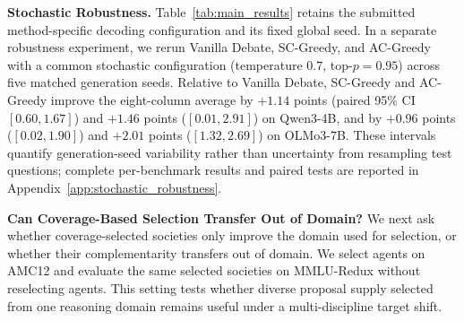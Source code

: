 \textbf{Stochastic Robustness.}
Table~\ref{tab:main_results} retains the submitted method-specific decoding
configuration and its fixed global seed. In a separate robustness experiment,
we rerun Vanilla Debate, SC-Greedy, and AC-Greedy with a common stochastic
configuration (temperature $0.7$, top-$p=0.95$) across five matched generation
seeds. Relative to Vanilla Debate, SC-Greedy and AC-Greedy improve the
eight-column average by $+1.14$ points (paired 95\% CI $[0.60,1.67]$) and
$+1.46$ points ($[0.01,2.91]$) on Qwen3-4B, and by $+0.96$ points
($[0.02,1.90]$) and $+2.01$ points ($[1.32,2.69]$) on OLMo3-7B. These
intervals quantify generation-seed variability rather than uncertainty from
resampling test questions; complete per-benchmark results and paired tests are
reported in Appendix~\ref{app:stochastic_robustness}.

\textbf{Can Coverage-Based Selection Transfer Out of Domain?}
\label{subsec:ood_transfer}
We next ask whether coverage-selected societies only improve the domain used
for selection, or whether their complementarity transfers out of domain. We
select agents on AMC12 and evaluate the same selected societies on MMLU-Redux
without reselecting agents. This setting tests whether diverse proposal supply
selected from one reasoning domain remains useful under a multi-discipline
target shift.

